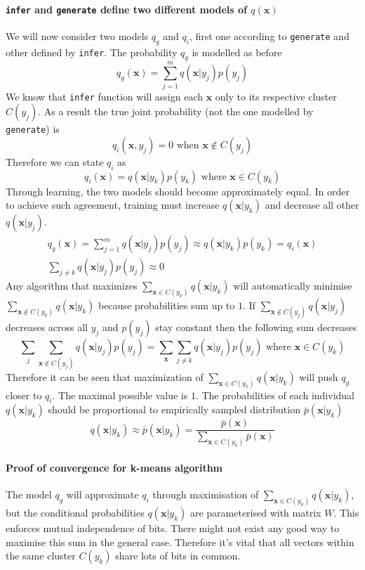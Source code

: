 \documentclass[12pt]{article}
\begin{document}
\paragraph{\texttt{infer} and \texttt{generate} define two different models of $q(\boldsymbol{x})$}
We will now consider two models $q_g$ and $q_i$, first one according to \texttt{generate} and other defined by \texttt{infer}. The probability $q_g$ is modelled as before
\[
q_g(\boldsymbol{x}) = \sum_{j=1}^{m} q(\boldsymbol{x}|y_j)p(y_j)
\]
We know that \texttt{infer} function will assign each $\boldsymbol{x}$ only to its respective cluster $C(y_j)$. As a result the true joint probability (not the one modelled by \texttt{generate}) is
\[
q_i(\boldsymbol{x},y_j) = 0 \text{ when } \boldsymbol{x}\notin C(y_j)
\]
Therefore we can state $q_i$ as
\[
q_i(\boldsymbol{x}) = q(\boldsymbol{x}|y_k)p(y_k)\text{ where }\boldsymbol{x}\in C(y_k)
\]
Through learning, the two models should become approximately equal. In order to achieve such agreement, training  must increase $q(\boldsymbol{x}|y_k)$ and decrease all other $q(\boldsymbol{x}|y_j)$. 
\begin{gather*}
	q_g(\boldsymbol{x}) = 	\sum_{j=1}^{m} q(\boldsymbol{x}|y_j)p(y_j) \approx q(\boldsymbol{x}|y_k)p(y_k) = q_i(\boldsymbol{x}) \\
	\sum_{j\ne k} q(\boldsymbol{x}|y_j)p(y_j) \approx 0 
\end{gather*}
Any algorithm that maximizes $\sum_{\boldsymbol{x}\in C(y_k)}q(\boldsymbol{x}|y_k)$ will automatically minimise $\sum_{\boldsymbol{x}\notin C(y_k)} q(\boldsymbol{x}|y_k)$  because probabilities sum up to $1$. If $\sum_{\boldsymbol{x}\notin C(y_j)} q(\boldsymbol{x}|y_j)$ decreases across all $y_j$ and $p(y_j)$ stay constant then the following sum decreases
\[
	\sum_{j} \sum_{\boldsymbol{x}\notin C(y_j)} q(\boldsymbol{x}|y_j) p(y_j) = \sum_{\boldsymbol{x}} \sum_{j\ne k}  q(\boldsymbol{x}|y_j) p(y_j) \text{ where }\boldsymbol{x}\in C(y_k)
\]
Therefore it can be seen that maximization of $\sum_{\boldsymbol{x}\in C(y_k)}q(\boldsymbol{x}|y_k)$ will push $q_g$ closer to $q_i$.  The maximal possible value is $1$.  The probabilities of each individual $q(\boldsymbol{x}|y_k)$ should be proportional to empirically sampled distribution $\bar{p}(\boldsymbol{x}|y_k)$
\[
q(\boldsymbol{x}|y_k) \approx \bar{p}(\boldsymbol{x}|y_k) = \frac{\bar{p}(\boldsymbol{x})}{\sum_{\boldsymbol{x}\in C(y_k)}\bar{p}(\boldsymbol{x})}
\]


\paragraph{Proof of convergence for k-means algorithm}
The model $q_g$ will approximate $q_i$ through maximisation of $\sum_{\boldsymbol{x}\in C(y_k)}q(\boldsymbol{x}|y_k)$, but the conditional probabilities $q(\boldsymbol{x}|y_k)$ are parameterised with matrix $W$. This enforces mutual independence of bits. There might not exist any good way to maximise this sum in the general case. Therefore it's vital that all vectors within the same cluster $C(y_k)$ share lots of bits in common. 
\end{document}
